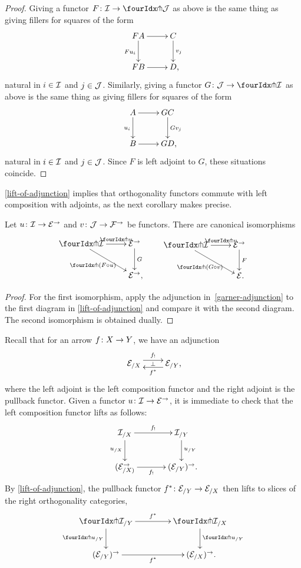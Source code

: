 \documentclass[reqno,10pt,a4paper,oneside,draft]{amsart}
\begin{document}
\begin{proof}
Giving a functor $F \co \cal{I} \to \liftl{\cal{J}}$ as above is the same thing as giving fillers for squares of the form
\[
\xymatrix{
  FA \ar[d]_{F u_i} \ar[r] & C \ar[d]^{v_j} \\
  FB \ar[r] & D \rlap{,}
}
\]
natural in $i \in \cal{I}$ and $j \in \cal{J}$.
Similarly, giving a functor $G \co \cal{J} \to \liftl{\cal{I}}$ as above is the same thing as giving fillers for squares of the form
\[
\xymatrix{
  A \ar[d]_{u_i} \ar[r] & GC \ar[d]^{Gv_j} \\
  B \ar[r] & GD \rlap{,}
}
\]
natural in $i \in \cal{I}$ and $j \in \cal{J}$.
Since $F$ is left adjoint to $G$, these situations coincide.
\end{proof}

\cref{lift-of-adjunction} implies that orthogonality functors commute with left composition with adjoints, as the next corollary makes precise.


\begin{corollary} \label{pitchfork-adjunction}
Let $u \co \cal{I} \to \cal{E}^\to$ and $v \co \cal{J} \to \cal{F}^\to$ be functors.
There are canonical isomorphisms
\begin{align*}
\xycenter{
\liftr{\cal{I}} \ar[dr]_-{\liftr{(F \cc u)}}  \ar[r]^-{\liftr{u}} & \cal{E}^\to \ar[d]^-G \\
& \cal{E}^\to \rlap{,} }  \qquad
\xycenter{
 \liftl{\cal{I}}  \ar[r]^-{\liftl{v}} \ar[dr]_-{\liftl{(G \cc v)}}  & \cal{E}^\to \ar[d]^-{F}   \\
& \cal{E} \rlap{.}  }
\end{align*}
\end{corollary}

\begin{proof}
For the first isomorphism, apply the adjunction in~\eqref{garner-adjunction} to the first diagram in \cref{lift-of-adjunction} and compare it with the second diagram.
The second isomorphism is obtained dually.
\end{proof}


\begin{example} \label{exa:composition-pullback-lift}
Recall that for an arrow $f \co X \to Y$, we have an adjunction
\[
\xymatrix{
\cal{E}_{/X} \ar@<1ex>[r]^{f_{!}} \ar@{}[r]|{\bot} & \cal{E}_{/Y} \rlap{,} \ar@<1ex>[l]^{f^*}}
\]
where the left adjoint is the left composition functor and the right adjoint is the pullback functor.
Given a functor $u \co \cal{I} \to \cal{E}^\to$, it is immediate to check that the left composition functor lifts as follows:
\[
\xymatrix@C+1em{
  \cal{I}_{/X}
  \ar[r]^-{f_!}
  \ar[d]_{u_{/X}}
&
  \cal{I}_{/Y}
  \ar[d]^{u_{/Y}}
\\
  (\calE_{/X)}^\to
  \ar[r]_-{f_!}
&
  (\calE_{/Y})^\to \rlap{.}
}
\]
By \cref{lift-of-adjunction}, the pullback functor $f^* \co \cal{E}_{/Y} \to \cal{E}_{/X}$ then lifts to slices of the right orthogonality categories,
\[
\xymatrix@C=1.5cm{
  \liftr{\cal{I}}_{/Y}
  \ar[d]_{\liftr{u}_{/Y}}
  \ar[r]^{f^*}
&
  \liftr{\cal{I}}_{/X}
  \ar[d]^{\liftr{u}_{/Y}}
\\
  (\catE_{/Y})^\to
  \ar[r]_{f^*}
&
  (\catE_{/X})^\to \rlap{.}
}
\]
\end{example}
\end{document}
